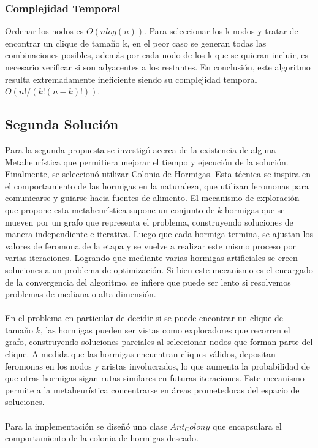 \documentclass{article}
\begin{document}
\subsubsection{Complejidad Temporal}
Ordenar los nodos es $O(nlog(n))$. Para seleccionar los k nodos y tratar de encontrar un clique de tamaño k, en el peor caso se generan todas las combinaciones posibles, además por cada nodo de los k que se quieran incluir, es necesario verificar si son adyacentes a los restantes. En conclusión, este algoritmo resulta extremadamente ineficiente siendo su complejidad temporal $O(n!/(k!(n-k)!))$.

\subsection{Segunda Solución}
Para la segunda propuesta se investigó acerca de la existencia de alguna Metaheurística que permitiera mejorar el tiempo y ejecución de la solución.
\\
Finalmente, se seleccionó utilizar Colonia de Hormigas. Esta técnica se inspira en el comportamiento de las hormigas en la naturaleza, que utilizan feromonas para comunicarse y guiarse hacia fuentes de alimento. El mecanismo de exploración que propone esta metaheurística supone un conjunto de $k$ hormigas que se mueven por un grafo que representa el problema, construyendo soluciones de manera independiente e iterativa. Luego que cada hormiga termina, se ajustan los valores de feromona de la etapa y se vuelve a realizar este mismo proceso por varias iteraciones. Logrando que mediante varias hormigas artificiales se 
creen soluciones a un problema de optimización. Si bien este mecanismo es el encargado de la convergencia del algoritmo, se infiere que puede ser lento si resolvemos problemas de mediana o alta dimensión.
\\
\\
En el problema en particular de decidir si se puede encontrar un clique de tamaño $k$, las hormigas pueden ser vistas como exploradores que recorren el grafo, construyendo soluciones parciales al seleccionar nodos que forman parte del clique. A medida que las hormigas encuentran cliques válidos, depositan feromonas en los nodos y aristas involucrados, lo que aumenta la probabilidad de que otras hormigas sigan rutas similares en futuras iteraciones. Este mecanismo permite a la metaheurística concentrarse en áreas prometedoras del espacio de soluciones.
\\
\\
Para la implementación se diseñó una clase $Ant_Colony$ que encapsulara el comportamiento de la colonia de hormigas deseado.
\end{document}

